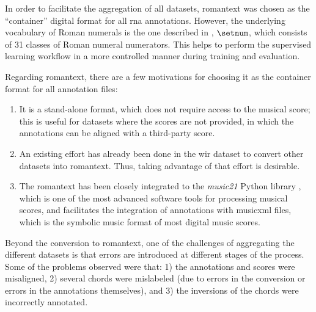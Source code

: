 
In order to facilitate the aggregation of all datasets,
\gls{romantext} was chosen as the ``container'' digital
format for all \gls{rna} annotations. However, the
underlying vocabulary of Roman numerals is the one described
in ,
$\setnum$, which consists of 31 classes of Roman numeral
numerators. This helps to perform the supervised learning
workflow in a more controlled manner during training and
evaluation.

Regarding \gls{romantext}, there are a few motivations for
choosing it as the container format for all annotation
files:

\begin{enumerate} 
    \item It is a stand-alone format, which does not require
    access to the musical score; this is useful for datasets
    where the scores are not provided, in which the
    annotations can be aligned with a third-party score.
    \item An existing effort has already been done in the
    \gls{wir} dataset
    \parencite{gotham2019romantext, gotham2022openscore}
    to convert other datasets into \gls{romantext}. Thus,
    taking advantage of that effort is desirable.
    \item The \gls{romantext} has been closely integrated to
    the \emph{music21} Python library
    \parencite{cuthbert2010music21}, which is one of the
    most advanced software tools for processing musical
    scores, and facilitates the integration of annotations
    with \gls{musicxml} files, which is the symbolic music
    format of most digital music scores.
\end{enumerate}

Beyond the conversion to \gls{romantext}, one of the
challenges of aggregating the different datasets is that
errors are introduced at different stages of the process.
Some of the problems observed were that: 1) the annotations
and scores were misaligned, 2) several chords were
mislabeled (due to errors in the conversion or errors in the
annotations themselves), and 3) the inversions of the chords
were incorrectly annotated.


